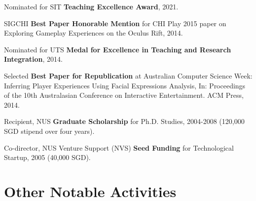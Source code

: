 \documentclass[10pt,a4paper]{article}
\renewenvironment{itemize}{
    \begin{list}{}{
            \setlength{\leftmargin}{1.5em}
            \setlength{\itemsep}{0.25em}
            \setlength{\parskip}{0pt}
            \setlength{\parsep}{0.25em}
        }
        }{
    \end{list}
}
\begin{document}
\begin{itemize}
    \item Nominated for SIT \textbf{Teaching Excellence Award}, 2021.
    \item SIGCHI \textbf{Best Paper Honorable Mention} for CHI Play 2015 paper on Exploring Gameplay Experiences on the Oculus Rift, 2014.

    \item Nominated for UTS \textbf{Medal for Excellence in Teaching and Research Integration}, 2014.

    \item Selected \textbf{Best Paper for Republication} at Australian Computer Science Week: Inferring Player Experiences Using Facial Expressions Analysis, In: Proceedings of the 10th Australasian Conference on Interactive Entertainment. ACM Press, 2014.

    \item Recipient, NUS \textbf{Graduate Scholarship} for Ph.D. Studies,
        2004-2008 (120,000 SGD stipend over four years).

    \item Co-director, NUS Venture Support (NVS) \textbf{Seed Funding} for Technological Startup,
        2005 (40,000 SGD).
\end{itemize}



\section*{Other Notable Activities}
\end{document}
